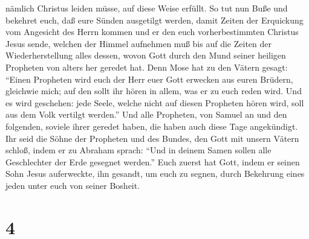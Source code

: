nämlich Christus leiden müsse, auf diese Weise erfüllt. 
So tut nun Buße und bekehret euch, daß eure Sünden ausgetilgt werden,
 damit Zeiten der Erquickung vom Angesicht des Herrn
kommen und er den euch vorherbestimmten Christus Jesus sende,
 welchen der Himmel aufnehmen muß bis auf die Zeiten der
Wiederherstellung alles dessen, wovon Gott durch den Mund seiner
heiligen Propheten von alters her geredet hat.  Denn Mose
hat zu den Vätern gesagt: ``Einen Propheten wird euch der Herr euer Gott
erwecken aus euren Brüdern, gleichwie mich; auf den sollt ihr hören in
allem, was er zu euch reden wird.  Und es wird geschehen:
jede Seele, welche nicht auf diesen Propheten hören wird, soll aus dem
Volk vertilgt werden.''  Und alle Propheten, von Samuel
an und den folgenden, soviele ihrer geredet haben, die haben auch diese
Tage angekündigt.  Ihr seid die Söhne der Propheten und
des Bundes, den Gott mit unsern Vätern schloß, indem er zu Abraham
sprach: ``Und in deinem Samen sollen alle Geschlechter der Erde gesegnet
werden.''  Euch zuerst hat Gott, indem er seinen Sohn
Jesus auferweckte, ihn gesandt, um euch zu segnen, durch Bekehrung eines
jeden unter euch von seiner Bosheit.

\hypertarget{section-3}{%
\section{4}\label{section-3}}

